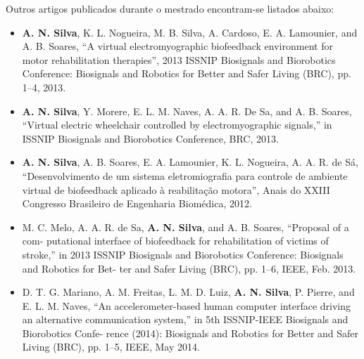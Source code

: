 \newpage
Outros artigos publicados durante o mestrado encontram-se listados abaixo:

\begin{itemize}
\item \textbf{A. N. Silva}, K. L. Nogueira, M. B. Silva, A. Cardoso, E. A. Lamounier, and A. B. Soares, “A virtual electromyographic biofeedback environment for motor rehabilitation therapies”, 2013 ISSNIP Biosignals and Biorobotics Conference: Biosignals and Robotics for Better and Safer Living (BRC), pp. 1–4, 2013.

\item \textbf{A. N. Silva}, Y. Morere, E. L. M. Naves, A. A. R. De Sa, and A. B. Soares, “Virtual electric wheelchair controlled by electromyographic signals,” in ISSNIP Biosignals and Biorobotics Conference, BRC, 2013.

\item \textbf{A. N. Silva}, A. B. Soares, E. A. Lamounier, K. L. Nogueira, A. A. R. de Sá, ``Desenvolvimento de um sistema eletromiografia para controle de ambiente virtual de biofeedback aplicado à reabilitação motora'', Anais do XXIII Congresso Brasileiro de Engenharia Biomédica, 2012.

\item M. C. Melo, A. A. R. de Sa, \textbf{A. N. Silva}, and A. B. Soares, “Proposal of a com-
putational interface of biofeedback for rehabilitation of victims of stroke,” in 2013
ISSNIP Biosignals and Biorobotics Conference: Biosignals and Robotics for Bet-
ter and Safer Living (BRC), pp. 1–6, IEEE, Feb. 2013.

\item D. T. G. Mariano, A. M. Freitas, L. M. D. Luiz, \textbf{A. N. Silva}, P. Pierre, and E. L. M.
Naves, “An accelerometer-based human computer interface driving an alternative
communication system,” in 5th ISSNIP-IEEE Biosignals and Biorobotics Confe-
rence (2014): Biosignals and Robotics for Better and Safer Living (BRC), pp. 1–5,
IEEE, May 2014.
\end{itemize}